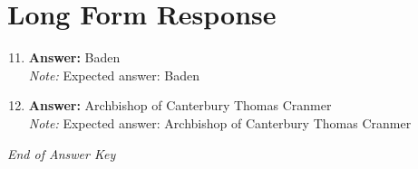 \documentclass[12pt]{article}
\begin{document}
\section*{Long Form Response}
\begin{enumerate}[label=\arabic*.]
\setcounter{enumi}{10}
\item \textbf{Answer:} Baden
\\ \textit{Note:} Expected answer: Baden
\item \textbf{Answer:} Archbishop of Canterbury Thomas Cranmer
\\ \textit{Note:} Expected answer: Archbishop of Canterbury Thomas Cranmer
\end{enumerate}

\vfill
\noindent\textit{End of Answer Key}
\end{document}
